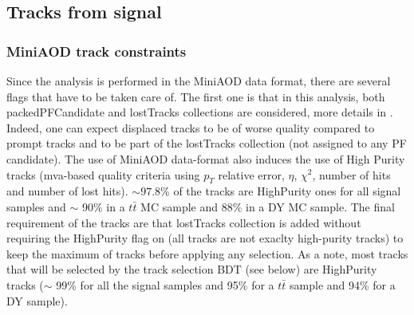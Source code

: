 \documentclass{cernatlasnote}
\begin{document}
\subsection{Tracks from signal}
\label{SUB:BDTRK}

\subsubsection{MiniAOD track constraints}
Since the analysis is performed in the MiniAOD data format, there are several flags that have to be taken care of. The first one is that in this analysis, both packedPFCandidate and lostTracks collections are considered, more details in \cite{MiniAOD}. Indeed, one can expect displaced tracks to be of worse quality compared to prompt tracks and to be part of the lostTracks collection (not assigned to any PF candidate). The use of MiniAOD data-format also induces the use of High Purity tracks  (mva-based quality criteria using $p_T$ relative error, $\eta$, $\chi^2$, number of hits and number of lost hits). $\sim 97.8$\% of the tracks are HighPurity ones for all signal samples and $\sim$ 90\% in a $t\bar{t}$ MC sample and 88\% in a DY MC sample. The final requirement of the tracks are that lostTracks collection is added without requiring the HighPurity flag on (all tracks are not exaclty high-purity tracks) to keep the maximum of tracks before applying any selection. As a note, most tracks that will be selected by the track selection BDT (see below) are HighPurity tracks ($\sim$ 99\% for all the signal samples and 95\% for a $t\bar{t}$ sample and 94\% for a DY sample).

        
\end{document}
